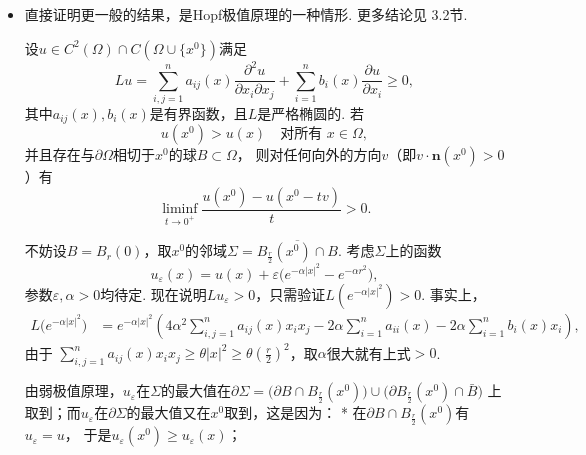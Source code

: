 \begin{itemize}
    \item[3.]
    直接证明更一般的结果，是Hopf极值原理的一种情形. 更多结论见\cite{GT} 3.2节.
    \begin{proposition2}
        设$u\in C^2(\varOmega)\cap C(\varOmega\cup\{x^0\})$满足
        $$Lu=\sum_{i,j=1}^na_{ij}(x)\frac{\partial^2u}{\partial x_i\partial x_j}
        +\sum_{i=1}^nb_i(x)\frac{\partial u}{\partial x_i}\geqslant0,$$
        其中$a_{ij}(x),b_i(x)$是有界函数，且$L$是严格椭圆的. 若
        $$u(x^0)>u(x)\quad\text{对所有 }x\in\varOmega,$$
        并且存在与$\partial\varOmega$相切于$x^0$的球$B\subset\varOmega$，
        则对任何向外的方向$v$（即$v\cdot\boldsymbol{n}(x^0)>0$）有
        $$\liminf_{t\rightarrow0^+}\frac{u(x^0)-u(x^0-tv)}{t}>0.$$
    \end{proposition2}

    不妨设$B=B_r(0)$，取$x^0$的邻域$\varSigma=\overline{B_\frac{r}{2}(x^0)\cap B}$.
    考虑$\varSigma$上的函数
    \[u_\varepsilon(x)=u(x)+\varepsilon\big(e^{-\alpha|x|^2}-e^{-\alpha r^2}\big),\]
    参数$\varepsilon,\alpha>0$均待定.
    现在说明$Lu_\varepsilon>0$，只需验证$L(e^{-\alpha|x|^2})>0$. 事实上，
    \begin{align*}
        L\big(e^{-\alpha|x|^2}\big)
        &=e^{-\alpha|x|^2}\left(4\alpha^2\sum_{i,j=1}^na_{ij}(x)x_ix_j
        -2\alpha\sum_{i=1}^na_{ii}(x)
        -2\alpha\sum_{i=1}^nb_{i}(x)x_i\right),
    \end{align*}
    由于
    $\sum\limits_{i,j=1}^na_{ij}(x)x_ix_j
    \geqslant\theta|x|^2\geqslant\theta(\frac{r}{2})^2$，取$\alpha$很大就有上式$>0$.

    由弱极值原理，$u_\varepsilon$在$\varSigma$的最大值在$\partial\varSigma
    =\big(\partial B\cap B_\frac{r}{2}(x^0)\big)\cup
    \big(\partial B_\frac{r}{2}(x^0)\cap\bar{B}\big)$
    上取到；而$u_\varepsilon$在$\partial\varSigma$的最大值又在$x^0$取到，这是因为：
    * 在$\partial B\cap B_\frac{r}{2}(x^0)$有$u_\varepsilon=u$，
    于是$u_\varepsilon(x^0)\geqslant u_\varepsilon(x)$；


\end{itemize}
